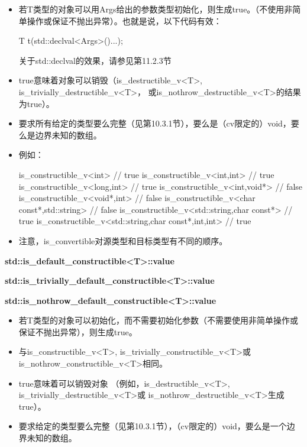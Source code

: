 \begin{itemize}
\item 
若T类型的对象可以用Args给出的参数类型初始化，则生成true。（不使用非简单操作或保证不抛出异常）。也就是说，以下代码有效：

\begin{cpp}
T t(std::declval<Args>()...);
\end{cpp}

\begin{notice}
关于std::declval的效果，请参见第11.2.3节
\end{notice}

\item
true意味着对象可以销毁（is\_destructible\_v<T>, is\_trivially\_destructible\_v<T>， 或is\_nothrow\_destructible\_v<T>的结果为true）。

\item
要求所有给定的类型要么完整（见第10.3.1节），要么是（cv限定的）void，要么是边界未知的数组。

\item
例如：
\begin{cpp}
is_constructible_v<int> // true
is_constructible_v<int,int> // true
is_constructible_v<long,int> // true
is_constructible_v<int,void*> // false
is_constructible_v<void*,int> // false
is_constructible_v<char const*,std::string> // false
is_constructible_v<std::string,char const*> // true
is_constructible_v<std::string,char const*,int,int> // true
\end{cpp}

\item
注意，is\_convertible对源类型和目标类型有不同的顺序。
\end{itemize}

\textbf{std::is\_default\_constructible<T>::value}

\textbf{std::is\_trivially\_default\_constructible<T>::value}

\textbf{std::is\_nothrow\_default\_constructible<T>::value}

\begin{itemize}
\item 
若T类型的对象可以初始化，而不需要初始化参数（不需要使用非简单操作或保证不抛出异常），则生成true。

\item 
与is\_constructible\_v<T>, is\_trivially\_constructible\_v<T>或 is\_nothrow\_constructible\_v<T>相同。

\item 
true意味着可以销毁对象 （例如，is\_destructible\_v<T>, is\_trivially\_destructible\_v<T>或 is\_nothrow\_destructible\_v<T>生成true）。

\item 
要求给定的类型要么完整（见第10.3.1节），（cv限定的）void，要么是一个边界未知的数组。
\end{itemize}

